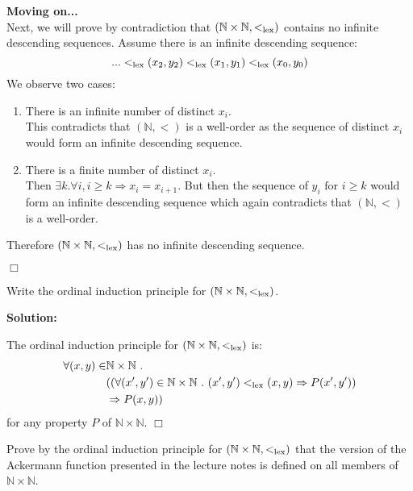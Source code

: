 \documentclass[11pt,fleqn]{article}
\newcommand{\be}{\begin{enumerate}}
\newcommand{\ee}{\end{enumerate}}
\newcommand{\sglsp}{\ }
\newenvironment{proof}{\par\noindent{\bf Proof\sglsp}}{\hfill$\Box$}
\begin{document}
\begin{proof}
	\textbf{Moving on...}\\
	Next, we will prove by contradiction that $(\mathbb{N} \times \mathbb{N}, <_{\rm lex})$ contains no infinite descending sequences. 
	Assume there is an infinite descending sequence:
		$$...<_{\rm lex} (x_2,y_2) <_{\rm lex} (x_1,y_1) <_{\rm lex} (x_0,y_0)$$
	We observe two cases:
	\be
		\item There is an infinite number of distinct $x_i$.\\
		This contradicts that $(\mathbb{N},<)$ is a well-order as the sequence of distinct $x_i$ would form an infinite descending sequence.
		\item There is a finite number of distinct $x_i$.\\
		Then $\exists k . \forall i, i \geq k \Rightarrow x_i = x_{i+1}$.
		But then the sequence of $y_i \text{ for } i \geq k$ would form an infinite descending sequence which again contradicts that $(\mathbb{N}, <)$ is a well-order.
	\ee
	Therefore $(\mathbb{N} \times \mathbb{N}, <_{\rm lex})$ has no infinite descending sequence.
	
\end{proof}

    \item Write the ordinal induction principle for $(\mathbb{N}
      \times \mathbb{N},<_{\rm lex})$.

\medskip

\textbf{Solution:}

\medskip

\begin{proof}
	The ordinal induction principle for $(\mathbb{N} \times \mathbb{N}, <_{\rm lex})$ is:\\
	\begin{align*}
		\forall (x,y) \in & \mathbb{N} \times \mathbb{N} ~.~ \\
			& (
				(\forall (x',y') \in \mathbb{N} \times \mathbb{N} ~.~
					(x',y') <_{\rm lex} (x,y) \Rightarrow P(x',y')) \\
			& \Rightarrow P(x,y))
	\end{align*}
	for any property $P$ of $\mathbb{N} \times \mathbb{N}$.
\end{proof}

    \item Prove by the ordinal induction principle for $(\mathbb{N}
      \times \mathbb{N},<_{\rm lex})$ that the version of the
      Ackermann function presented in the lecture notes is defined on
      all members of $\mathbb{N} \times \mathbb{N}$.
\end{document}
